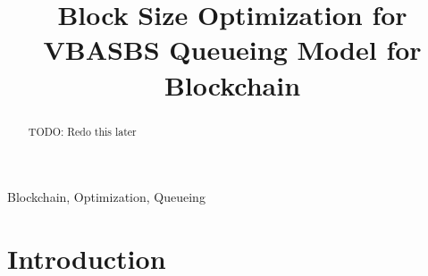 \documentclass[conference]{IEEEtran}
\begin{document}
\title{Block Size Optimization for VBASBS Queueing Model for Blockchain}

\author{
}

\maketitle

\begin{abstract}

TODO: Redo this later

\end{abstract}

\begin{IEEEkeywords}
Blockchain, Optimization, Queueing
\end{IEEEkeywords}

\section{Introduction}\label{Intro}
\end{document}
